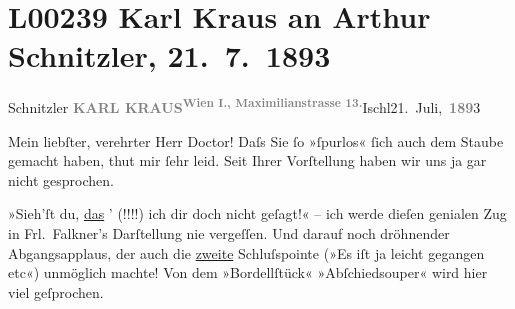 

\section[Karl Kraus an Arthur Schnitzler, 21. 7. 1893]{L00239 Karl Kraus an Arthur Schnitzler, 21. 7. 1893}
\nopagebreak{}
\rehead{ }\normalsize\beginnumbering{}
\toendnotes[C]{\smallbreak\pagebreak[2]}
\toendnotes[C]{\smallbreak}\pstart{}{\pb}Schnitzler\pend{}{\bigskip}\vspace{1em}
\pstart
           {\pb}\textcolor{gray}{\textbf{KARL KRAUS}}\hfill \substVorne{}\textsuperscript{\textcolor{gray}{\textbf{Wien I., Maximilianstrasse
                              13.}}}\substDazwischen{}Ischl\substHinten{}{ }21. Juli, \textcolor{gray}{\textbf{189}}3\pend
           
\pstart{}Mein liebſter, verehrter Herr Doctor!\pend\vspace{0.5em}
\pstart
           Daſs Sie ſo »ſpurlos« ſich auch dem Staube gemacht haben, thut mir ſehr leid. Seit
               Ihrer Vorſtellung haben wir uns ja gar nicht gesprochen.\pend
           
\pstart
           »Sieh’ſt du, \uline{das}{ }’ (!!!!) ich dir \introOben{}doch\introOben{}
               nicht geſagt!« – ich werde dieſen genialen Zug in Frl. Falkner’s Darſtellung nie vergeſſen. Und darauf noch dröhnender
               Abgangsapplaus, der  auch die \uline{zweite}{ }Schluſspointe (»Es iſt ja leicht gegangen etc«) unmöglich machte! Von dem
               »Bordellſtück« »Abſchiedsouper« wird hier viel
               geſprochen.\pend
           
